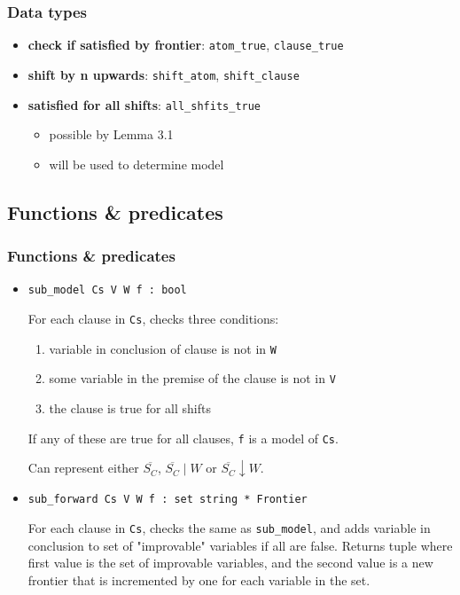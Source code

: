 \documentclass[slides]{beamer}
\begin{document}
\begin{frame}[fragile]
    \frametitle{Data types}

    \begin{itemize}
        \item
            \textbf{check if satisfied by frontier}: \lstinline{atom_true}, \lstinline{clause_true}
        \item
            \textbf{shift by n upwards}: \lstinline{shift_atom}, \lstinline{shift_clause}
        \item
            \textbf{satisfied for all shifts}: \lstinline{all_shfits_true}
            \begin{itemize}
                \item
                    possible by Lemma 3.1
                \item
                    will be used to determine model
            \end{itemize}
    \end{itemize}
\end{frame}

\subsection{Functions \& predicates}

\begin{frame}[fragile]
    \frametitle{Functions \& predicates}

    \begin{itemize}
        \item \begin{minipage}{\linewidth}\lstinline{sub_model Cs V W f : bool}\end{minipage}
            For each clause in \lstinline{Cs}, checks three conditions:
            \begin{enumerate}
                \item
                    variable in conclusion of clause is not in \lstinline{W}
                \item
                    some variable in the premise of the clause is not in \lstinline{V}
                \item
                    the clause is true for all shifts
            \end{enumerate}
            If any of these are true for all clauses, \lstinline{f} is a model of \lstinline{Cs}.

            Can represent either $\overline{S_C}$, $\overline{S_C}\mid W$ or $\overline{S_C}\downarrow W$.
        \item \begin{minipage}{\linewidth}\lstinline{sub_forward Cs V W f : set string * Frontier}\end{minipage}
            For each clause in \lstinline{Cs}, checks the same as \lstinline{sub_model},
            and adds variable in conclusion to set of "improvable" variables if all are false.
            Returns tuple where first value is the set of improvable variables,
            and the second value is a new frontier that is incremented by one for each variable in the set.
    \end{itemize}
\end{frame}
\end{document}
